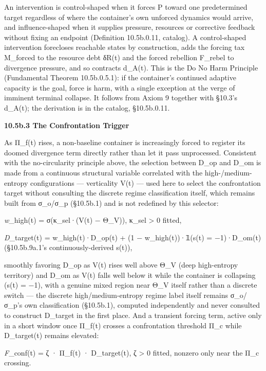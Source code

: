 \documentclass[
]{article}
\begin{document}
An intervention is control-shaped when it forces P toward one
predetermined target regardless of where the container's own unforced
dynamics would arrive, and influence-shaped when it supplies pressure,
resources or corrective feedback without fixing an endpoint (Definition
10.5b.0.11, catalog). A control-shaped intervention forecloses reachable
states by construction, adds the forcing tax M\_forced to the resource
debt δR(t) and the forced rebellion F\_rebel to divergence pressure, and
so contracts d\_A(t). This is the Do No Harm Principle (Fundamental
Theorem 10.5b.0.5.1): if the container's continued adaptive capacity is
the goal, force is harm, with a single exception at the verge of
imminent terminal collapse. It follows from Axiom 9 together with
§10.3's d\_A(t); the derivation is in the catalog, §10.5b.0.11.

\textbf{10.5b.3 The Confrontation Trigger}

As Π\_f(t) rises, a non-baseline container is increasingly forced to
register its doomed divergence term directly rather than let it pass
unprocessed. Consistent with the no-circularity principle above, the
selection between D\_op and D\_om is made from a continuous structural
variable correlated with the high-/medium-entropy configurations ---
verticality V(t) --- used here to select the confrontation target
without consulting the discrete regime classification itself, which
remains built from σ\_o/σ\_p (§10.5b.1) and is not redefined by this
selector:

\emph{w}\_high(t) = σ(κ\_sel·(V(t) − Θ\_V)), κ\_sel \textgreater{} 0
fitted,

\emph{D}\_target(t) = w\_high(t)·D\_op(t) + (1 − w\_high(t))·𝟙(s(t) =
−1)·D\_om(t) (§10.5b.9a.1's continuously-derived s(t)),

smoothly favoring D\_op as V(t) rises well above Θ\_V (deep high-entropy
territory) and D\_om as V(t) falls well below it while the container is
collapsing (s(t) = −1), with a genuine mixed region near Θ\_V itself
rather than a discrete switch --- the discrete high/medium-entropy
regime label itself remains σ\_o/σ\_p's own classification (§10.5b.1),
computed independently and never consulted to construct D\_target in the
first place. And a transient forcing term, active only in a short window
once Π\_f(t) crosses a confrontation threshold Π\_c while D\_target(t)
remains elevated:

\emph{F}\_conf(t) = ζ · Π\_f(t) · D\_target(t), ζ \textgreater{} 0
fitted, nonzero only near the Π\_c crossing.
\end{document}
